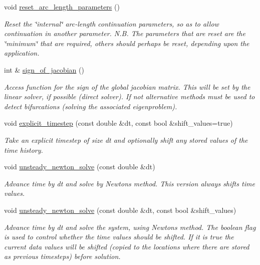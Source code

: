 \begin{DoxyCompactItemize}
void \hyperlink{classoomph_1_1Problem_a6477df6e8184dc78e9d9ff82c7627cef}{reset\+\_\+arc\+\_\+length\+\_\+parameters} ()
\begin{DoxyCompactList}\small\item\em Reset the \char`\"{}internal\char`\"{} arc-\/length continuation parameters, so as to allow continuation in another parameter. N.\+B. The parameters that are reset are the \char`\"{}minimum\char`\"{} that are required, others should perhaps be reset, depending upon the application. \end{DoxyCompactList}\item 
int \& \hyperlink{classoomph_1_1Problem_a797cb28b5fffe976fc7541421eb423a1}{sign\+\_\+of\+\_\+jacobian} ()
\begin{DoxyCompactList}\small\item\em Access function for the sign of the global jacobian matrix. This will be set by the linear solver, if possible (direct solver). If not alternative methods must be used to detect bifurcations (solving the associated eigenproblem). \end{DoxyCompactList}\item 
void \hyperlink{classoomph_1_1Problem_ab8b74c5b1499b2d712a8545cccbd97c2}{explicit\+\_\+timestep} (const double \&dt, const bool \&shift\+\_\+values=true)
\begin{DoxyCompactList}\small\item\em Take an explicit timestep of size dt and optionally shift any stored values of the time history. \end{DoxyCompactList}\item 
void \hyperlink{classoomph_1_1Problem_aef22157aadc15a512cca93e4c423ff73}{unsteady\+\_\+newton\+\_\+solve} (const double \&dt)
\begin{DoxyCompactList}\small\item\em Advance time by dt and solve by Newton\textquotesingle{}s method. This version always shifts time values. \end{DoxyCompactList}\item 
void \hyperlink{classoomph_1_1Problem_abf8b8c9ee09df0ba8934382740a588de}{unsteady\+\_\+newton\+\_\+solve} (const double \&dt, const bool \&shift\+\_\+values)
\begin{DoxyCompactList}\small\item\em Advance time by dt and solve the system, using Newton\textquotesingle{}s method. The boolean flag is used to control whether the time values should be shifted. If it is true the current data values will be shifted (copied to the locations where there are stored as previous timesteps) before solution. \end{DoxyCompactList}\item 

\end{DoxyCompactItemize}
